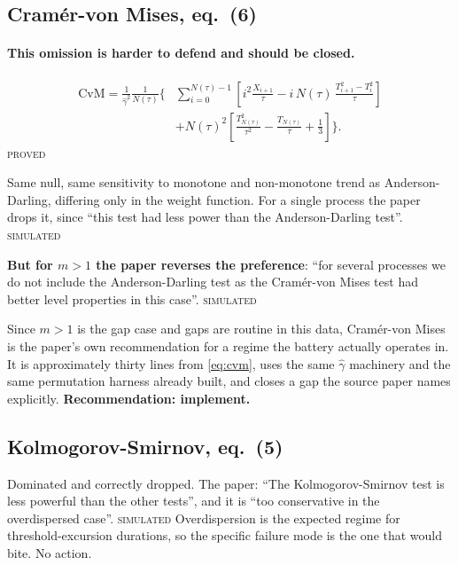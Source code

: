 \documentclass[11pt,a4paper]{article}
\newcommand{\gh}{\hat\gamma}
\newcommand{\Ntau}{N(\tau)}
\newcommand{\PROVED}{\textsc{\textcolor{blue!55!black}{proved}}}
\newcommand{\SIMULATED}{\textsc{\textcolor{orange!70!black}{simulated}}}
\begin{document}
\subsection{Cramér-von Mises, eq.~(6)}

\paragraph{This omission is harder to defend and should be closed.}
%
\begin{equation}
\begin{split}
\mathrm{CvM} = \frac{1}{\gh^2}\frac{1}{\Ntau}
\Biggl\{&\sum_{i=0}^{\Ntau-1}\left[i^2\frac{X_{i+1}}{\tau}
- i\,\Ntau\,\frac{T_{i+1}^2 - T_i^2}{\tau}\right]\\
&+ \Ntau^2\left[\frac{T_{\Ntau}^2}{\tau^2} - \frac{T_{\Ntau}}{\tau}
+ \frac{1}{3}\right]\Biggr\}.
\end{split}
\label{eq:cvm}
\end{equation}
\PROVED

Same null, same sensitivity to monotone and non-monotone trend as Anderson-Darling,
differing only in the weight function. For a single process the paper drops it, since
\enquote{this test had less power than the Anderson-Darling test}. \SIMULATED

\medskip
\noindent\textbf{But for $m > 1$ the paper reverses the preference}: \enquote{for
several processes we do not include the Anderson-Darling test as the Cramér-von Mises
test had better level properties in this case}. \SIMULATED

Since $m > 1$ is the gap case and gaps are routine in this data, Cramér-von Mises is the
paper's own recommendation for a regime the battery actually operates in. It is
approximately thirty lines from \eqref{eq:cvm}, uses the same $\gh$ machinery and the
same permutation harness already built, and closes a gap the source paper names
explicitly. \textbf{Recommendation: implement.}

\subsection{Kolmogorov-Smirnov, eq.~(5)}

Dominated and correctly dropped. The paper: \enquote{The Kolmogorov-Smirnov test is less
powerful than the other tests}, and it is \enquote{too conservative in the overdispersed
case}. \SIMULATED{} Overdispersion is the expected regime for threshold-excursion
durations, so the specific failure mode is the one that would bite. No action.
\end{document}
